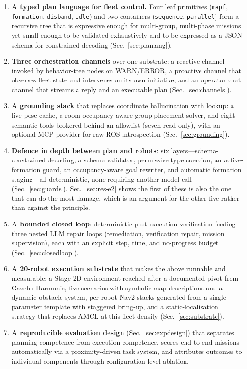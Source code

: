 \documentclass[10pt,twocolumn]{article}
\newcommand{\code}[1]{\texttt{\small #1}}
\begin{document}
\begin{enumerate}[label=(\arabic*)]
\item \textbf{A typed plan language for fleet control.} Four leaf primitives
(\code{mapf}, \code{formation}, \code{disband}, \code{idle}) and two containers
(\code{sequence}, \code{parallel}) form a recursive tree that is expressive
enough for multi-group, multi-phase missions yet small enough to be validated
exhaustively and to be expressed as a JSON schema for constrained decoding
(Sec.~\ref{sec:planlang}).

\item \textbf{Three orchestration channels} over one substrate: a reactive
channel invoked by behavior-tree nodes on WARN/ERROR, a proactive channel that
observes fleet state and intervenes on its own initiative, and an operator chat
channel that streams a reply and an executable plan (Sec.~\ref{sec:channels}).

\item \textbf{A grounding stack} that replaces coordinate hallucination with
lookup: a live pose cache, a room-occupancy-aware group placement solver, and
eight semantic tools brokered behind an allowlist (seven read-only), with an
optional MCP provider for raw ROS introspection (Sec.~\ref{sec:grounding}).

\item \textbf{Defence in depth between plan and robots}: six layers---schema-constrained decoding, a schema validator, permissive type coercion,
an active-formation guard, an occupancy-aware goal rewriter, and automatic
formation staging---all deterministic, none requiring another model call
(Sec.~\ref{sec:guards}).
Sec.~\ref{sec:res-e2} shows the first of these is also the one that can do the
most damage, which is an argument for the other five rather than against the
principle.

\item \textbf{A bounded closed loop}: deterministic post-execution
verification feeding three nested LLM repair loops (remediation, verification
repair, mission supervision), each with an explicit step, time, and
no-progress budget (Sec.~\ref{sec:closedloop}).

\item \textbf{A 20-robot execution substrate} that makes the above runnable and
measurable: a Stage 2D environment reached after a documented pivot from Gazebo
Harmonic, five scenarios with symbolic map descriptions and a dynamic obstacle
system, per-robot Nav2 stacks generated from a single parameter template with
staggered bring-up, and a static-localization strategy that replaces AMCL at
this fleet density (Sec.~\ref{sec:substrate}).

\item \textbf{A reproducible evaluation design} (Sec.~\ref{sec:expdesign}) that
separates planning competence from execution competence, scores end-to-end
missions automatically via a proximity-driven task system, and attributes
outcomes to individual components through configuration-level ablation.
\end{enumerate}
\end{document}
